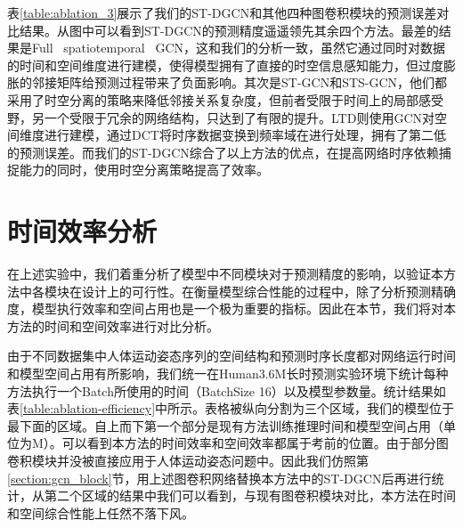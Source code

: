 表\ref{table:ablation_3}展示了我们的ST-DGCN和其他四种图卷积模块的预测误差对比结果。从图中可以看到ST-DGCN的预测精度遥遥领先其余四个方法。最差的结果是Full \ spatiotemporal \ GCN，这和我们的分析一致，虽然它通过同时对数据的时间和空间维度进行建模，使得模型拥有了直接的时空信息感知能力，但过度膨胀的邻接矩阵给预测过程带来了负面影响。其次是ST-GCN和STS-GCN，他们都采用了时空分离的策略来降低邻接关系复杂度，但前者受限于时间上的局部感受野，另一个受限于冗余的网络结构，只达到了有限的提升。LTD则使用GCN对空间维度进行建模，通过DCT将时序数据变换到频率域在进行处理，拥有了第二低的预测误差。而我们的ST-DGCN综合了以上方法的优点，在提高网络时序依赖捕捉能力的同时，使用时空分离策略提高了效率。

\section{时间效率分析}
在上述实验中，我们着重分析了模型中不同模块对于预测精度的影响，以验证本方法中各模块在设计上的可行性。在衡量模型综合性能的过程中，除了分析预测精确度，模型执行效率和空间占用也是一个极为重要的指标。因此在本节，我们将对本方法的时间和空间效率进行对比分析。

\begin{table}[ht]
    \centering
    \caption{时间效率和模型空间占用对比}\label{table:ablation-efficiency}
    \end{table}
由于不同数据集中人体运动姿态序列的空间结构和预测时序长度都对网络运行时间和模型空间占用有所影响，我们统一在Human3.6M长时预测实验环境下统计每种方法执行一个Batch所使用的时间（BatchSize 16）以及模型参数量。统计结果如表\ref{table:ablation-efficiency}中所示。表格被纵向分割为三个区域，我们的模型位于最下面的区域。自上而下第一个部分是现有方法训练推理时间和模型空间占用（单位为M）。可以看到本方法的时间效率和空间效率都属于考前的位置。由于部分图卷积模块并没被直接应用于人体运动姿态问题中。因此我们仿照第\ref{section:gcn_block}节，用上述图卷积网络替换本方法中的ST-DGCN后再进行统计，从第二个区域的结果中我们可以看到，与现有图卷积模块对比，本方法在时间和空间综合性能上任然不落下风。

